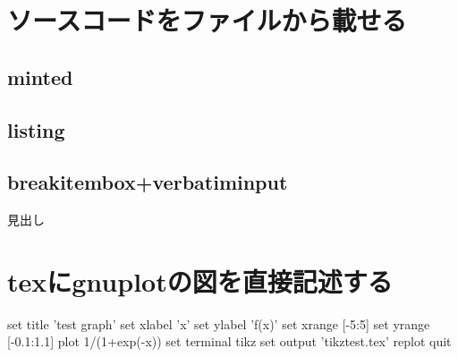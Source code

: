 \documentclass[a4j,titlepage,dvipdfmx]{jsarticle}   %
\begin{document}
\section{ソースコードをファイルから載せる}
\subsection{minted}

\subsection{listing}


\subsection{breakitembox+verbatiminput}
\begin{breakitembox}[l]{見出し}
   
\end{breakitembox}
\section{texにgnuplotの図を直接記述する}
\begin{shellcode}
  set title 'test graph'
  set xlabel 'x'
  set ylabel 'f(x)'
  set xrange [-5:5]
  set yrange [-0.1:1.1]
  plot 1/(1+exp(-x))
  set terminal tikz
  set output 'tikztest.tex'
  replot
  quit
\end{shellcode}
\centering
\resizebox{\columnwidth}{!}{}
\end{document}

